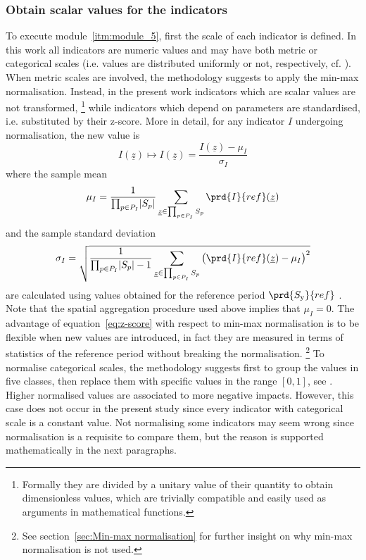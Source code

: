 \subsubsection{Obtain scalar values for the indicators}
To execute module~\ref{itm:module_5}, first the scale of each \gls{indicator} is defined. In this work all \glspl{indicator} are numeric values and may have both metric or categorical scales (i.e. values are distributed uniformly or not, respectively, cf. \cite[109]{2017GIZTheVulnerability}).
When metric scales are involved, the methodology suggests to apply the min-max normalisation. Instead, in the present work \glspl{indicator} which are scalar values are not transformed,%
\footnote{Formally they are divided by a unitary value of their quantity to obtain dimensionless values, which are trivially compatible and easily used as arguments in mathematical functions.}
while \glspl{indicator} which depend on parameters are standardised, i.e. substituted by their z-score. More in detail, for any \gls{indicator} $I$ undergoing normalisation, the new value is
\begin{equation}
  \label{eq:z-score}
  I(\underline{z}) \mapsto I(\underline{z}) = \frac{I(\underline{z}) - \mu_I}{\sigma_I}
\end{equation}
where the sample mean
\begin{equation}
  \label{eq:sample_mean}
  \mu_I = \frac{1}{\prod_{p \in P_I} \abs{S_p}} \sum_{\underline{z} \in \prod_{p \in P_I} S_p} \prd{I}{ref}(\underline{z})
\end{equation}
and the sample standard deviation
\begin{equation}
  \label{eq:sample_standard_deviation}
  \sigma_I = \sqrt{\frac{1}{\prod_{p \in P_I} \abs{S_p} - 1} \sum_{\underline{z} \in \prod_{p \in P_I} S_p} \big( \prd{I}{ref}(\underline{z}) - \mu_I \big)^2}
\end{equation}
are calculated using values obtained for the reference period $\prd{S_\text{y}}{ref}$ \cite[84]{2008OECDHandbookOn}. Note that the spatial aggregation procedure used above implies that $\mu_I = 0$. The advantage of equation~\eqref{eq:z-score} with respect to min-max normalisation is to be flexible when new values are introduced, in fact they are measured in terms of statistics of the reference period without breaking the normalisation.%
\footnote{See section~\ref{sec:Min-max normalisation} for further insight on why min-max normalisation is not used.}
To normalise categorical scales, the methodology suggests first to group the values in five classes, then replace them with specific values in the range $[0, 1]$, see \cite[115-116]{2017GIZTheVulnerability}. Higher normalised values are associated to more negative impacts. However, this case does not occur in the present study since every \gls{indicator} with categorical scale is a constant value. Not normalising some \glspl{indicator} may seem wrong since normalisation is a requisite to compare them, but the reason is supported mathematically in the next paragraphs.

